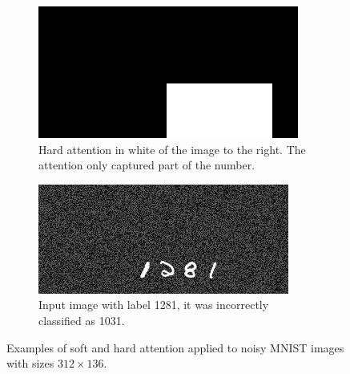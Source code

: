 \begin{figure}
    \begin{subfigure}[c]{0.45\textwidth}
        \centering    \includegraphics[scale=2.0]{resources/MNIST_hard_att/1281_att.jpg}
        \caption{Hard attention in white of the image to the right. The attention only captured part of the number.}
    \end{subfigure} \quad %
    \begin{subfigure}[c]{0.45\textwidth}
        \centering
        \includegraphics[scale=2.0]{resources/MNIST_hard_att/1281_fail_1031.jpg}
        \caption{Input image with label 1281, it was incorrectly classified as 1031.}
    \end{subfigure}
    \caption{Examples of soft and hard attention applied to noisy MNIST images with sizes $312 \times 136$.}
    \label{fig:attention_mnist}
\end{figure}
